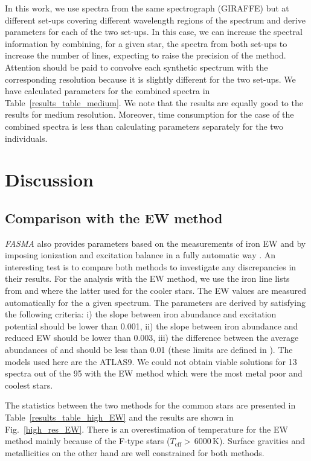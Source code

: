 \documentclass[fleqn,usenatbib]{mnras}
\begin{document}
In this work, we use spectra from the same spectrograph (GIRAFFE) but at different set-ups covering different wavelength regions of the spectrum and derive parameters for each of the two set-ups. 
In this case, we can increase the spectral information by combining, for a given star, the spectra from both set-ups to increase the number of lines, expecting to raise the precision of the method. 
Attention should be paid to convolve each synthetic spectrum with the corresponding resolution because it is slightly different for the two set-ups. We have calculated parameters for the 
combined spectra in Table~\ref{results_table_medium}. We note that the results are equally good to the results for medium resolution. Moreover, time consumption for the case of the combined 
spectra is less than calculating parameters separately for the two individuals. 

\section{Discussion}\label{discussion}

\subsection{Comparison with the EW method}

\textit{FASMA} also provides parameters based on the measurements of iron EW and by imposing ionization and excitation balance in a fully automatic way \citep[see details in][]{Andreasen2017}. 
An interesting test is to compare both methods to investigate any discrepancies in their results. For the analysis with the EW method, we use the iron line lists from \cite{sousa2008} and 
\cite{tsantaki13} where the latter used for the cooler stars. The EW values are measured automatically for the a given spectrum. 
The parameters are derived by satisfying the following criteria: 
i) the slope between iron abundance and excitation potential should be lower than 0.001, ii) the slope between iron abundance and reduced EW should be lower than 0.003, iii) the difference 
between the average abundances of  and  should be less than 0.01 (these limits are defined in \cite{Andreasen2017}). The models used here are the ATLAS9.
We could not obtain viable solutions for 13 spectra out of the 95 with the EW method which were the most metal poor and coolest stars. 

The statistics between the two methods for the common stars are presented in Table~\ref{results_table_high_EW} and the results are shown in Fig.~\ref{high_res_EW}. There is an 
overestimation of temperature for the EW method mainly because of the F-type stars ($T_{\mathrm{eff}}>$\,6000\,K). Surface gravities and metallicities on the other hand are well 
constrained for both methods. 
\end{document}
